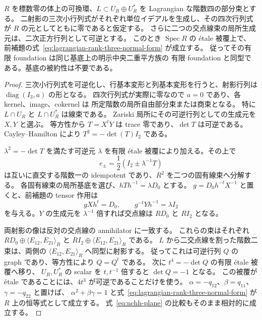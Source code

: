 \begin{proposition}[非被約閉基底上の両階数三正規形]
\label{prop:lagrangian-relative-double-rank-three}
$R$ を標数零の体上の可換環、$L\subset U_R\oplus U_R^*$ を
Lagrangian な階数四の部分束とする。
二射影の三次小行列式がそれぞれ単位イデアルを生成し、その四次行列式が
$R$ の元としてともに零であると仮定する。
さらに二つの交点線束の局所生成元は、二次正方行列として可逆とする。
このとき $\operatorname{Spec}R$ の \texorpdfstring{\'etale}{etale} 被覆上で、
前補題の式~\eqref{eq:lagrangian-rank-three-normal-form} が成立する。
従ってその有限 foundation は同じ基底上の明示中央二重平方族の
有限 foundation と同型である。基底の被約性は不要である。
\end{proposition}
\begin{proof}
三次小行列式を可逆化し、行基本変形と列基本変形を行うと、射影行列は
$\operatorname{diag}(I_3,a)$ の形となる。
四次行列式が実際に零なので $a=0$ であり、各 kernel、image、cokernel は
所定階数の局所自由部分束または商束となる。
特に $L\cap U_R$ と $L\cap U_R^*$ は線束である。
Zariski 局所にその可逆行列としての生成元を $X,Y$ と選ぶ。
等方性から $T=X^tY$ は trace 零であり、$\det T$ は可逆である。
Cayley--Hamilton により $T^2=-\det(T)I_2$ である。

$\lambda^2=-\det T$ を満たす可逆元 $\lambda$ を有限 \texorpdfstring{\'etale}{etale}
被覆により加える。その上で
\[
 e_\pm=\frac12(I_2\pm\lambda^{-1}T)
\]
は互いに直交する階数一の idempotent であり、$R^2$ を二つの固有線束へ分解する。
各固有線束の局所基底を選び、$hTh^{-1}=\lambda D_0$ とする。
$g=D_0h^{-t}X^{-1}$ と置くと、前補題の tensor 作用は
\[
 gXh^t=D_0,\qquad g^{-t}Yh^{-1}=\lambda I_2
\]
を与える。$Y$ の生成元を $\lambda^{-1}$ 倍すれば交点線は $RD_0$ と $RI_2$ となる。

両射影の像は反対の交点線の annihilator に一致する。
これらの束はそれぞれ
$RD_0\oplus\langle E_{12},E_{21}\rangle_R$ と
$RI_2\oplus\langle E_{12},E_{21}\rangle_R$ である。
$L$ から二交点線を割った階数二束は、両側の
$\langle E_{12},E_{21}\rangle_R$ へ同型に射影する。
従ってこれは可逆行列 $Q$ の graph であり、等方性により $Q=Q^t$ である。
次に $t^4=-\det Q$ の有限 \texorpdfstring{\'etale}{etale} 被覆へ移り、
$U_R,U_R^*$ の scalar を $t,t^{-1}$ 倍すると $\det Q=-1$ となる。
この被覆が \texorpdfstring{\'etale}{etale} であることには、$4t^3$ が可逆であることだけを使う。
$\alpha=-q_{12}$、$\beta=q_{11}$、$\gamma=-q_{22}$ と置けば、
$\alpha^2+\beta\gamma=1$ と式~\eqref{eq:lagrangian-rank-three-normal-form} が
$R$ 上の恒等式として成立する。
式~\ref{eq:nchh-plane} の比較もそのまま相対的に成立する。
\end{proof}

